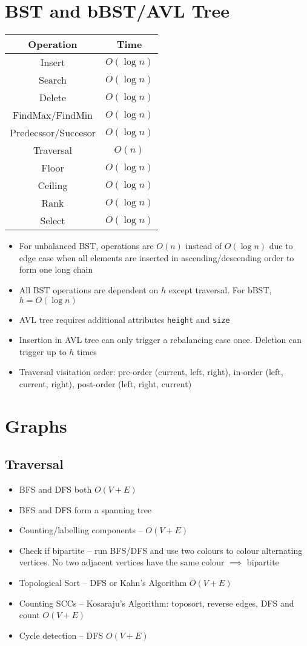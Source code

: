 \documentclass[frenchspacing,12pt,a4paper]{article}
\theoremstyle{remark}
\begin{document}
\section{BST and bBST/AVL Tree}
\begin{center}
	\begin{tabular}{c|c}
		\textbf{Operation} & \textbf{Time}\\
		\hline
		Insert & $O(\log n)$\\\hline
		Search & $O(\log n)$\\\hline
		Delete &  $O(\log n)$\\\hline
		FindMax/FindMin &  $O(\log n)$\\\hline
		Predecssor/Succesor &  $O(\log n)$\\\hline
		Traversal & $O(n)$ \\\hline
		Floor & $O(\log n)$\\\hline
		Ceiling &  $O(\log n)$\\\hline
		Rank &  $O(\log n)$ \\\hline
		Select &  $O(\log n)$
	\end{tabular}
\end{center}
\begin{itemize}
	\item For unbalanced BST, operations are $O(n)$ instead of  $O(\log n)$ due to edge case when all elements are inserted in ascending/descending order to form one long chain
	\item All BST operations are dependent on $h$ except traversal. For bBST, $h=O(\log n)$
	\item AVL tree requires additional attributes \texttt{height} and \texttt{size}
	\item Insertion in AVL tree can only trigger a rebalancing case once. Deletion can trigger up to $h$ times
	\item Traversal visitation order: pre-order (current, left, right), in-order (left, current, right), post-order (left, right, current)
\end{itemize}

\section{Graphs}
\subsection{Traversal}
\begin{itemize}
	\item BFS and DFS both $O(V+E)$
	\item BFS and DFS form a spanning tree
	\item Counting/labelling components -- $O(V+E)$
	\item Check if bipartite -- run BFS/DFS and use two colours to colour alternating vertices. No two adjacent vertices have the same colour $\implies$ bipartite
	\item Topological Sort -- DFS or Kahn's Algorithm $O(V+E)$
	\item Counting SCCs -- Kosaraju's Algorithm: toposort, reverse edges, DFS and count $O(V+E)$
	\item Cycle detection -- DFS $O(V+E)$
\end{itemize}
\end{document}
